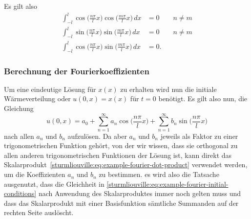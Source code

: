 Es gilt also
\[
\begin{aligned}
    \int_{-l}^{l}\cos\biggl(\frac{n \pi}{l}x\biggr)
    \cos\biggl(\frac{m \pi}{l}x\biggr)\,dx
    &= 0 \qquad n \neq m \\
    \int_{-l}^{l}\sin\biggl(\frac{n \pi}{l}x\biggr)
    \sin\biggl(\frac{m \pi}{l}x\biggr)\,dx
    &= 0 \qquad n \neq m \\
    \int_{-l}^{l}\cos\biggl(\frac{n \pi}{l}x\biggr)
    \sin\biggl(\frac{m \pi}{l}x\biggr)\,dx
    &= 0.
\end{aligned}
\]

\subsubsection{Berechnung der Fourierkoeffizienten}

%
%

Um eine eindeutige Lösung für $x(x)$ zu erhalten wird nun die initiale
Wärmeverteilung oder $u(0, x) = x(x)$ für $t = 0$ benötigt.
Es gilt also nun, die Gleichung
\begin{equation}
    \label{sturmliouville:eq:example-fourier-initial-conditions}
    u(0, x)
    =
    a_0
    +
    \sum_{n = 1}^{\infty} a_n\cos\biggl(\frac{n\pi}{l}x\biggr)
    +
    \sum_{n = 1}^{\infty} b_n\sin\biggl(\frac{n\pi}{l}x\biggr)
\end{equation}
nach allen $a_n$ und $b_n$ aufzulösen.
Da aber $a_n$ und $b_n$ jeweils als Faktor zu einer trigonometrischen Funktion
gehört, von der wir wissen, dass sie orthogonal zu allen anderen
trigonometrischen Funktionen der Lösung ist, kann direkt das
Skalarprodukt~\eqref{sturmliouville:eq:example-fourier-dot-product}
verwendet werden, um die Koeffizienten $a_n$ und $b_n$ zu bestimmen.
es wird also die Tatsache ausgenutzt, dass die Gleichheit in
\eqref{sturmliouville:eq:example-fourier-initial-conditions} nach Anwendung des
Skalarproduktes immer noch gelten muss und dass das Skalarprodukt mit einer
Basisfunktion sämtliche Summanden auf der rechten Seite auslöscht.

